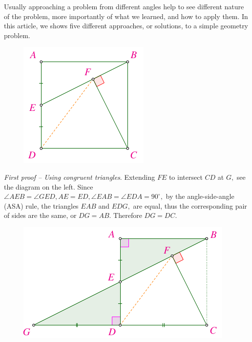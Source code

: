 \begin{multicols}{2}
	Usually approaching a problem from different angles help to see different nature of the problem,
	more importantly of what we learned, and how to apply them.
	In this article, we shows five different approaches, or solutions, to a simple geometry problem.
	\vskip 0.2cm
	\begin{figure}[H]
		\vspace*{-5pt}
		\centering
		\captionsetup{labelformat= empty, justification=centering}
		\includegraphics[width= 0.7\linewidth]{2022-2-ms-1-1.pdf}
		\vspace*{-15pt}
	\end{figure}
	\textit{First proof -- Using congruent triangles}.
	Extending $FE$ to intersect $CD$ at $G,$ see the diagram on the left. 
	Since $\angle AEB = \angle GED, AE = ED, \angle EAB = \angle EDA = 90^\circ,$
	by the angle-side-angle (ASA) rule, the triangles $ EAB$ and $EDG,$ are equal,
	thus the corresponding pair of sides are the same, or $DG=AB$. Therefore $DG=DC.$
	\begin{figure}[H]
		\vspace*{-5pt}
		\centering
		\captionsetup{labelformat= empty, justification=centering}
		\includegraphics[width= 1\linewidth]{2022-2-ms-1-1-a.pdf}

\end{figure}
\end{multicols}

